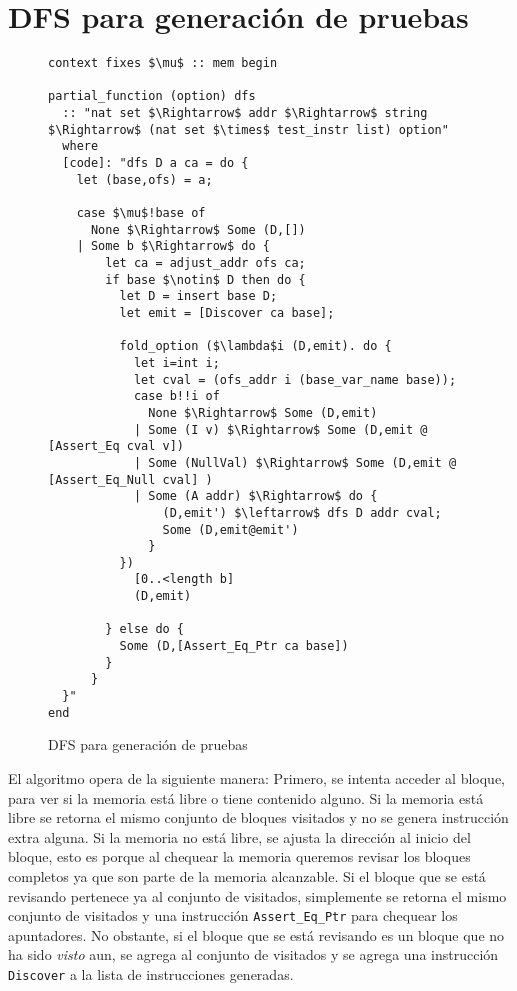\chapter{DFS para generación de pruebas}
\label{ap:dfs_test}

\begin{figure}
\begin{lstlisting}[mathescape=true]
context fixes $\mu$ :: mem begin

partial_function (option) dfs
  :: "nat set $\Rightarrow$ addr $\Rightarrow$ string $\Rightarrow$ (nat set $\times$ test_instr list) option"
  where
  [code]: "dfs D a ca = do {
    let (base,ofs) = a;

    case $\mu$!base of
      None $\Rightarrow$ Some (D,[])
    | Some b $\Rightarrow$ do {
        let ca = adjust_addr ofs ca;
        if base $\notin$ D then do {
          let D = insert base D;
          let emit = [Discover ca base];

          fold_option ($\lambda$i (D,emit). do {
            let i=int i;
            let cval = (ofs_addr i (base_var_name base));
            case b!!i of
              None $\Rightarrow$ Some (D,emit)
            | Some (I v) $\Rightarrow$ Some (D,emit @ [Assert_Eq cval v])
            | Some (NullVal) $\Rightarrow$ Some (D,emit @ [Assert_Eq_Null cval] )
            | Some (A addr) $\Rightarrow$ do {
                (D,emit') $\leftarrow$ dfs D addr cval;
                Some (D,emit@emit')
              }
          })
            [0..<length b]
            (D,emit)

        } else do {
          Some (D,[Assert_Eq_Ptr ca base])
        }
      }
  }"
end
\end{lstlisting}

\caption{DFS para generación de pruebas}
\end{figure}

El algoritmo opera de la siguiente manera:
Primero, se intenta acceder al bloque, para ver si la memoria está libre o tiene contenido alguno.
Si la memoria está libre se retorna el mismo conjunto de bloques visitados y no se genera instrucción extra alguna.
Si la memoria no está libre, se ajusta la dirección al inicio del bloque, esto es porque al chequear la memoria queremos revisar los bloques completos ya que son parte de la memoria alcanzable.
Si el bloque que se está revisando pertenece ya al conjunto de visitados, simplemente se retorna el mismo conjunto de visitados y una instrucción \verb|Assert_Eq_Ptr| para chequear los apuntadores.
No obstante, si el bloque que se está revisando es un bloque que no ha sido \textit{visto} aun, se agrega al conjunto de visitados y se agrega una instrucción \verb|Discover| a la lista de instrucciones generadas.

